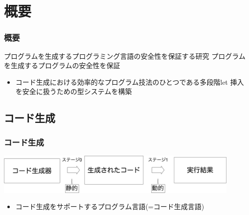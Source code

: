 
\section{概要}

\begin{frame}
  \frametitle{概要}
  プログラムを生成するプログラミング言語の安全性を保証する研究
  プログラムを生成するプログラムの安全性を保証
  \begin{itemize}
  \item<1-> [⇒] コード生成における効率的なプログラム技法のひとつである\alert{多段階let 挿入}を安全に扱うための型システムを構築
  \end{itemize}
\end{frame}

\subsection{コード生成}
\begin{frame}
  \frametitle{コード生成}
  \medskip
  \flushleft
  \includegraphics[clip,height=2cm]{./img/prggen.png}

  \begin{itemize}
  \item コード生成をサポートするプログラム言語(=\alert{コード生成言語})
  \end{itemize}
\end{frame}

